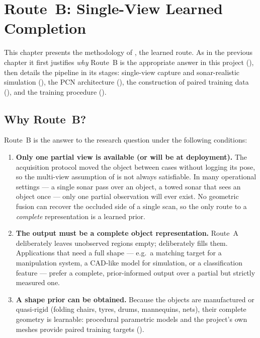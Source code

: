 \chapter{Route~B: Single-View Learned Completion}
\label{ch:routeB}

This chapter presents the methodology of \routeB, the learned route. As in the
previous chapter it first justifies \emph{why} Route~B is the appropriate
answer in this project (), then details the pipeline in
its stages: single-view capture and sonar-realistic simulation
(), the PCN architecture (),
the construction of paired training data (), and the
training procedure ().

\section{Why Route~B?}
\label{sec:why_routeB}

Route~B is the answer to the research question under the following conditions:

\begin{enumerate}
  \item \textbf{Only one partial view is available (or will be at
  deployment).} The \suop{} acquisition protocol moved the object between
  cases without logging its pose, so the multi-view assumption of \routeA{}
  is not always satisfiable. In many operational settings --- a single sonar
  pass over an object, a towed sonar that sees an object once --- only one
  partial observation will ever exist. No geometric fusion can recover the
  occluded side of a single scan, so the only route to a \emph{complete}
  representation is a learned prior.
  \item \textbf{The output must be a complete object representation.}
  Route~A deliberately leaves unobserved regions empty; \routeB{} deliberately
  fills them. Applications that need a full shape --- e.g.\ a matching target
  for a manipulation system, a CAD-like model for simulation, or a
  classification feature --- prefer a complete, prior-informed output over a
  partial but strictly measured one.
  \item \textbf{A shape prior can be obtained.} Because the objects are
  manufactured or quasi-rigid (folding chairs, tyres, drums, mannequins,
  nets), their complete geometry is learnable: procedural parametric models and
  the project's own \routeA{} meshes provide paired training targets
  ().
\end{enumerate}

